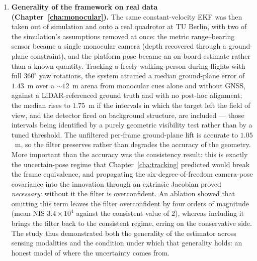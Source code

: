 \begin{enumerate}
  \item \textbf{Generality of the framework on real data
  (Chapter~\ref{cha:monocular}).}
  The same constant-velocity EKF was then taken out of simulation and onto a real
  quadrotor at TU Berlin, with two of the simulation's assumptions removed at once:
  the metric range--bearing sensor became a single monocular camera (depth
  recovered through a ground-plane constraint), and the platform pose became an
  on-board estimate rather than a known quantity. Tracking a freely walking person
  during flights with full $360^\circ$ yaw rotations, the system attained a median
  ground-plane error of $1.43$~m over a ${\sim}12$~m arena from monocular cues alone
  and without GNSS, against a LiDAR-referenced ground truth and with no post-hoc
  alignment; the median rises to $1.75$~m if the intervals in which the target
  left the field of view, and the detector fired on background structure, are
  included --- those intervals being identified by a purely geometric visibility
  test rather than by a tuned threshold. The unfiltered per-frame ground-plane lift is accurate to $1.05$~m,
  so the filter preserves rather than degrades the accuracy of the geometry. More important than the accuracy was the consistency result: this is
  exactly the uncertain-pose regime that Chapter~\ref{cha:tracking} predicted would
  break the frame equivalence, and propagating the six-degree-of-freedom camera-pose
  covariance into the innovation through an extrinsic Jacobian proved
  \emph{necessary}: without it the filter is overconfident. An ablation showed that omitting this term leaves
  the filter overconfident by four orders of magnitude (mean NIS $3.4\times10^{4}$
  against the consistent value of $2$), whereas including it brings the filter back
  to the consistent regime, erring on the conservative side. The study thus demonstrated both the generality of the estimator
  across sensing modalities and the condition under which that generality holds: an
  honest model of where the uncertainty comes from.
\end{enumerate}

